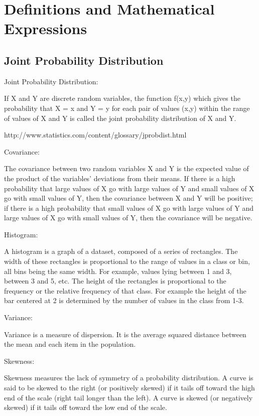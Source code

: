 \chapter{Definitions and Mathematical Expressions}

\section{Joint Probability Distribution}

Joint Probability Distribution: 

If X and Y are discrete random variables, the function f(x,y) which
gives the probability that X = x and Y = y for each pair of values
(x,y) within the range of values of X and Y is called the joint 
probability distribution of X and Y. 

http://www.statistics.com/content/glossary/jprobdist.html



Covariance: 

The covariance between two random variables X and Y is the expected
value of the product of the variables' deviations from their means. If
there is a high probability that large values of X go with large
values of Y and small values of X go with small values of Y, then the 
covariance between X and Y will be positive; if there is a high 
probability that small values of X go with large values of Y and 
large values of X go with small values of Y, then the covariance
will be negative. 

Histogram: 

                      
A histogram is a graph of a dataset, composed of a series of
rectangles. The width of these rectangles is proportional to 
the range of values in a class or bin, all bins being the same 
width. For example, values lying between 1 and 3, between 3 and 5,
etc. The height of the rectangles is proportional to the frequency 
or the relative frequency of that class. For example the height of 
the bar centered at 2 is determined by the number of values in the 
class from 1-3. 


Variance: 

Variance is a measure of dispersion. It is the average squared 
distance between the mean and each item in the population. 

Skewness: 

                          
Skewness measures the lack of symmetry of a probability distribution. 
A curve is said to be skewed to the right (or positively skewed) if 
it tails off toward the high end of the scale (right tail longer than 
the left). A curve is skewed (or negatively skewed) if it tails off 
toward the low end of the scale. 

